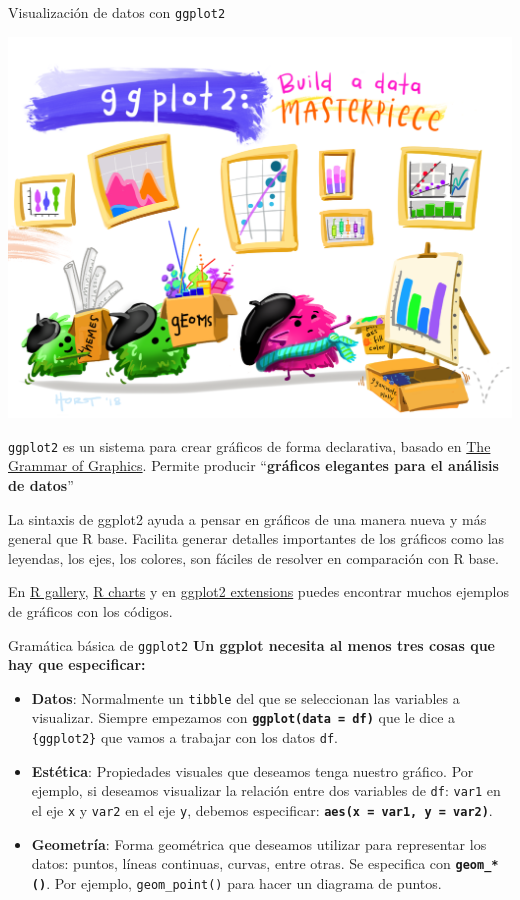 \documentclass[
  ignorenonframetext,
  aspectratio=169]{beamer}
\begin{document}
\begin{frame}[fragile]{Visualización de datos con \texttt{ggplot2}}
\begin{center}\includegraphics[width=0.3\linewidth,height=0.3\textheight]{Imgs/ggplot2} \end{center}

\texttt{ggplot2} es un sistema para crear gráficos de forma declarativa,
basado en
\href{https://link.springer.com/chapter/10.1007/978-3-642-21551-3_13}{The
Grammar of Graphics}. Permite producir ``\textbf{gráficos elegantes para
el análisis de datos}''

La sintaxis de ggplot2 ayuda a pensar en gráficos de una manera nueva y
más general que R base. Facilita generar detalles importantes de los
gráficos como las leyendas, los ejes, los colores, son fáciles de
resolver en comparación con R base.

En \href{https://r-graph-gallery.com/}{R gallery},
\href{https://r-charts.com}{R charts} y en
\href{https://exts.ggplot2.tidyverse.org/gallery/}{ggplot2 extensions}
puedes encontrar muchos ejemplos de gráficos con los códigos.
\end{frame}

\begin{frame}[fragile]{Gramática básica de \texttt{ggplot2}}
\protect\hypertarget{gramuxe1tica-buxe1sica-de-ggplot2}{}
\textbf{Un ggplot necesita al menos tres cosas que hay que especificar:
}

\begin{itemize}
\item
  \textbf{Datos}: Normalmente un \texttt{tibble} del que se seleccionan
  las variables a visualizar. Siempre empezamos con
  \textbf{\texttt{ggplot(data\ =\ df)}} que le dice a
  \texttt{\{ggplot2\}} que vamos a trabajar con los datos \texttt{df}.
\item
  \textbf{Estética}: Propiedades visuales que deseamos tenga nuestro
  gráfico. Por ejemplo, si deseamos visualizar la relación entre dos
  variables de \texttt{df}: \texttt{var1} en el eje \texttt{x} y
  \texttt{var2} en el eje \texttt{y}, debemos especificar:
  \textbf{\texttt{aes(x\ =\ var1,\ y\ =\ var2)}}.
\item
  \textbf{Geometría}: Forma geométrica que deseamos utilizar para
  representar los datos: puntos, líneas continuas, curvas, entre otras.
  Se especifica con \textbf{\texttt{geom\_*()}}. Por ejemplo,
  \texttt{geom\_point()} para hacer un diagrama de puntos.
\end{itemize}
\end{frame}
\end{document}
